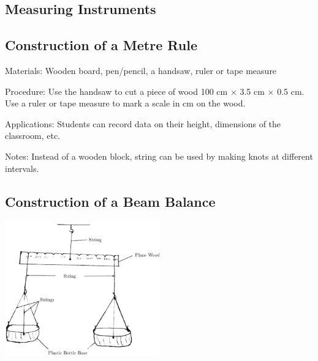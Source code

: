 \begin{multicols}{2}

\section*{Measuring Instruments}


\subsection{Construction of a Metre Rule}
\label{sub:metrerule}

\begin{description*}
\item[Materials:]{Wooden board, pen\slash pencil, a handsaw, ruler or tape measure}
\item[Procedure:]{Use the handsaw to cut a piece of wood 100 cm $\times$ 3.5 cm $\times$ 0.5 cm. Use a ruler or tape measure to mark a scale in cm on the wood.}
\item[Applications:]{Students can record data on their height, dimensions of the classroom, etc.}
\item[Notes:]{Instead of a wooden block, string can be used by making knots at different intervals.}
\end{description*}

\subsection{Construction of a Beam Balance}
\label{sub:beambalance}

\begin{center}
\includegraphics[width=0.5\textwidth]{./img/beam-balance.png}
\end{center}


\end{multicols}
